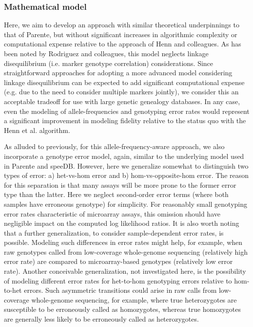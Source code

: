 \documentclass{article}
\begin{document}
\subsubsection{Mathematical model}
Here, we aim to develop an approach with similar theoretical underpinnings to that of Parente, but without significant increases in algorithmic complexity or computational expense relative to the approach of Henn and colleagues. As has been noted by Rodriguez and colleagues,\citep{Parente}\citep{Parente2} this model neglects linkage disequilibrium (i.e. marker genotype correlation) considerations. Since straightforward approaches for adopting a more advanced model considering linkage disequilibrium can be expected to add significant computational expense (e.g. due to the need to consider multiple markers jointly), we consider this an acceptable tradeoff for use with large genetic genealogy databases. In any case, even the modeling of allele-frequencies and genotyping error rates would represent a significant improvement in modeling fidelity relative to the status quo with the Henn et al. algorithm.

As alluded to previously, for this allele-frequency-aware approach, we also incorporate a genotype error model, again, similar to the underlying model used in Parente and speeDB.\citep{Parente} \citep{speeDB} However, here we generalize somewhat to distinguish two types of error: a) het-vs-hom error and b) hom-vs-opposite-hom error. The reason for this separation is that many assays will be more prone to the former error type than the latter. Here we neglect second-order error terms (where both samples have erroneous genotype) for simplicity. For reasonably small genotyping error rates characteristic of microarray assays, this omission should have negligible impact on the computed log likelihood ratios. It is also worth noting that a further generalization, to consider sample-dependent error rates, is possible. Modeling such differences in error rates might help, for example, when raw genotypes called from low-coverage whole-genome sequencing (relatively high error rate) are compared to microarray-based genotypes (relatively low error rate). Another conceivable generalization, not investigated here, is the possibility of modeling different error rates for het-to-hom genotyping errors relative to hom-to-het errors. Such asymmetric transitions could arise in raw calls from low-coverage whole-genome sequencing, for example, where true heterozygotes are susceptible to be erroneously called as homozygotes, whereas true homozygotes are generally less likely to be erroneously called as heterozygotes. 
\end{document}
